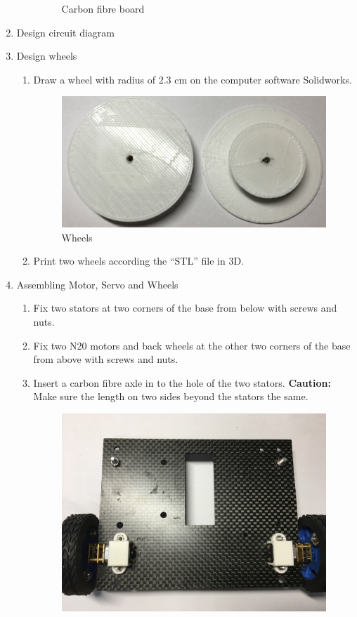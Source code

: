 \begin{enumerate}
\begin{enumerate}
\begin{figure}[H]
\begin{center}
	\end{center}
 	\caption{Carbon fibre board \label{fig:carbonFiberBoard}}
	\end{figure}
	\end{enumerate}
\item Design circuit diagram 
\item Design wheels
	\begin{enumerate}
	\item Draw a wheel with radius of 2.3 cm on the computer software Solidworks.\\
	\begin{figure}[H]
	\begin{center}
	\includegraphics[width=10cm]{figure/procedure/p3}
	\end{center}
 	\caption{Wheels \label{fig:wheels}}
	\end{figure}
	\item Print two wheels according the ``STL'' file in 3D.
	\end{enumerate}
\item Assembling Motor, Servo and Wheels
	\begin{enumerate}
	\item Fix two stators at two corners of the base from below with screws and nuts. 
	\item Fix two N20 motors and back wheels at the other two corners of the base from above with screws and nuts.
	\item Insert a carbon fibre axle in to the hole of the two stators. \textbf{Caution:} Make sure the length on two sides beyond the stators the same. \\
	\begin{figure}[H]
	\begin{center}
	\includegraphics[width =10cm]{figure/procedure/p4}

\end{center}
\end{figure}
\end{enumerate}
\end{enumerate}
